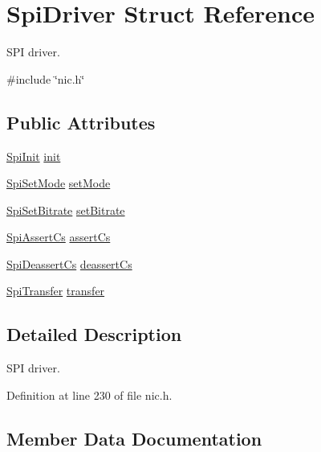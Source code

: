\hypertarget{structSpiDriver}{}\section{Spi\+Driver Struct Reference}
\label{structSpiDriver}


S\+PI driver.  




{\ttfamily \#include \char`\"{}nic.\+h\char`\"{}}

\subsection*{Public Attributes}
\begin{DoxyCompactItemize}
\item 
\hyperlink{nic_8h_a5641b785b2d731fb89fe8e582e5727a6}{Spi\+Init} \hyperlink{structSpiDriver_a7fd019d8a8a5b17f90924552c69f0203}{init}
\item 
\hyperlink{nic_8h_adf96940921e97bad16877a29ee08b7ba}{Spi\+Set\+Mode} \hyperlink{structSpiDriver_aa3a63d109bce9213ccfeb8c0c0c286af}{set\+Mode}
\item 
\hyperlink{nic_8h_aaf7cee9ed915be68ba8c3bbe2a2366ab}{Spi\+Set\+Bitrate} \hyperlink{structSpiDriver_a3f30ebc4111f9e6e91e9d6971a8ffe8d}{set\+Bitrate}
\item 
\hyperlink{nic_8h_a5367e86c609a9e08a7fdaeb4ea35035b}{Spi\+Assert\+Cs} \hyperlink{structSpiDriver_a705a221265ce31ce5701cb0ad58395bc}{assert\+Cs}
\item 
\hyperlink{nic_8h_a314bf7aa989ddd1b04e72751382d2a3c}{Spi\+Deassert\+Cs} \hyperlink{structSpiDriver_af4efd0e67546c1a488d7a4a7e2e58c36}{deassert\+Cs}
\item 
\hyperlink{nic_8h_a9563443a6b4fdbea93e0ba3c607ef4c2}{Spi\+Transfer} \hyperlink{structSpiDriver_aa74fa5d2edab78a2ff616ca3297ee372}{transfer}
\end{DoxyCompactItemize}


\subsection{Detailed Description}
S\+PI driver. 

Definition at line 230 of file nic.\+h.



\subsection{Member Data Documentation}
\mbox{\label{structSpiDriver_a705a221265ce31ce5701cb0ad58395bc}} 
